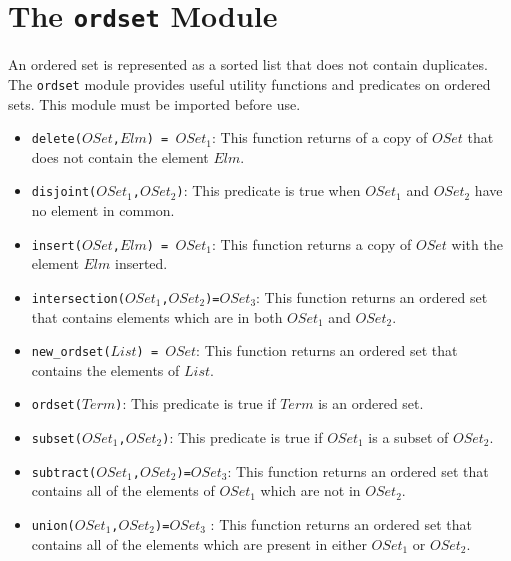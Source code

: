 \chapter{The \texttt{ordset} Module}
An ordered set is represented as a sorted list that does not contain duplicates. The \texttt{ordset} module provides useful utility functions and predicates on ordered sets. This module must be imported before use.

\begin{itemize}
\item \texttt{delete($OSet$,$Elm$) = $OSet_1$}: This function returns of a copy of $OSet$ that does not contain the element $Elm$.
\item \texttt{disjoint($OSet_1$,$OSet_2$)}: This predicate is true when $OSet_1$ and $OSet_2$ have no element in common. 
\item \texttt{insert($OSet$,$Elm$) = $OSet_1$}: This function returns a copy of $OSet$ with the element $Elm$ inserted.
\item \texttt{intersection($OSet_1$,$OSet_2$)=$OSet_3$}: This function returns an ordered set that contains elements which are in both $OSet_1$ and $OSet_2$.
\item \texttt{new\_ordset($List$) = $OSet$}: This function returns an ordered set that contains the elements of $List$.
\item \texttt{ordset($Term$)}: This predicate is true if $Term$ is an ordered set.
\item \texttt{subset($OSet_1$,$OSet_2$)}: This predicate is true if $OSet_1$ is a subset of $OSet_2$.
\item \texttt{subtract($OSet_1$,$OSet_2$)=$OSet_3$}: This function returns an ordered set that contains all of the elements of $OSet_1$ which are not in $OSet_2$.
\item \texttt{union($OSet_1$,$OSet_2$)=$OSet_3$} : This function returns an ordered set that contains all of the elements which are present in either $OSet_1$ or $OSet_2$.
\end{itemize}

\ignore{

}
